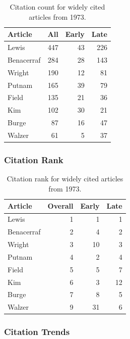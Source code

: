 \documentclass[
  10pt,
  letterpaper,
  DIV=11,
  numbers=noendperiod,
  twoside]{scrartcl}
\begin{document}
\begin{longtable}[]{@{}lrrr@{}}

\caption{\label{tbl-citation-count-1973}Citation count for widely cited
articles from 1973.}

\tabularnewline

\toprule\noalign{}
Article & All & Early & Late \\
\midrule\noalign{}
\endhead
\bottomrule\noalign{}
\endlastfoot
Lewis & 447 & 43 & 226 \\
Benacerraf & 284 & 28 & 143 \\
Wright & 190 & 12 & 81 \\
Putnam & 165 & 39 & 79 \\
Field & 135 & 21 & 36 \\
Kim & 102 & 30 & 21 \\
Burge & 87 & 16 & 47 \\
Walzer & 61 & 5 & 37 \\

\end{longtable}

\subsubsection*{Citation Rank}\label{sec-rank-1973}

\begin{longtable}[]{@{}lrrr@{}}

\caption{\label{tbl-citation-rank-1973}Citation rank for widely cited
articles from 1973.}

\tabularnewline

\toprule\noalign{}
Article & Overall & Early & Late \\
\midrule\noalign{}
\endhead
\bottomrule\noalign{}
\endlastfoot
Lewis & 1 & 1 & 1 \\
Benacerraf & 2 & 4 & 2 \\
Wright & 3 & 10 & 3 \\
Putnam & 4 & 2 & 4 \\
Field & 5 & 5 & 7 \\
Kim & 6 & 3 & 12 \\
Burge & 7 & 8 & 5 \\
Walzer & 9 & 31 & 6 \\

\end{longtable}

\subsubsection*{Citation Trends}\label{sec-trends-1973}
\end{document}
